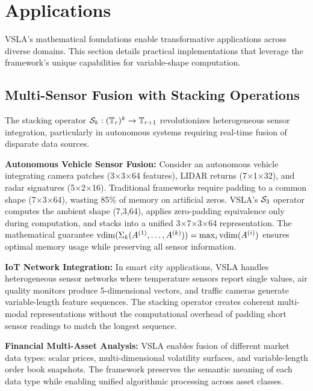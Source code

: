 \section{Applications}
\label{sec:applications}

VSLA's mathematical foundations enable transformative applications across diverse domains. This section details practical implementations that leverage the framework's unique capabilities for variable-shape computation.

\subsection{Multi-Sensor Fusion with Stacking Operations}

The stacking operator $\mathcal{S}_k: (\mathbb{T}_r)^k \to \mathbb{T}_{r+1}$ revolutionizes heterogeneous sensor integration, particularly in autonomous systems requiring real-time fusion of disparate data sources.

\textbf{Autonomous Vehicle Sensor Fusion:} Consider an autonomous vehicle integrating camera patches (3×3×64 features), LIDAR returns (7×1×32), and radar signatures (5×2×16). Traditional frameworks require padding to a common shape (7×3×64), wasting 85\% of memory on artificial zeros. VSLA's $\mathcal{S}_3$ operator computes the ambient shape (7,3,64), applies zero-padding equivalence only during computation, and stacks into a unified 3×7×3×64 representation. The mathematical guarantee $\operatorname{vdim}(\Sigma_k(A^{(1)}, \ldots, A^{(k)})) = \max_i \operatorname{vdim}(A^{(i)})$ ensures optimal memory usage while preserving all sensor information.

\textbf{IoT Network Integration:} In smart city applications, VSLA handles heterogeneous sensor networks where temperature sensors report single values, air quality monitors produce 5-dimensional vectors, and traffic cameras generate variable-length feature sequences. The stacking operator creates coherent multi-modal representations without the computational overhead of padding short sensor readings to match the longest sequence.

\textbf{Financial Multi-Asset Analysis:} VSLA enables fusion of different market data types: scalar prices, multi-dimensional volatility surfaces, and variable-length order book snapshots. The framework preserves the semantic meaning of each data type while enabling unified algorithmic processing across asset classes.

